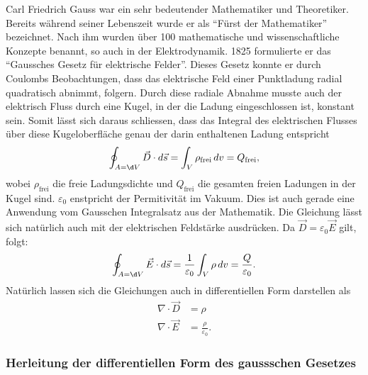 Carl Friedrich Gauss war ein sehr bedeutender Mathematiker und Theoretiker.
Bereits während seiner Lebenszeit wurde er als ``Fürst der Mathematiker'' bezeichnet.
Nach ihm wurden über 100 mathematische und wissenschaftliche Konzepte benannt, so auch in der Elektrodynamik.\cite{maxwell:Carl_Friedrich_Gauß}
1825 formulierte er das ``Gaussches Gesetz für elektrische Felder''.
Dieses Gesetz konnte er durch Coulombs Beobachtungen, dass das elektrische Feld einer Punktladung radial quadratisch abnimmt, folgern.
Durch diese radiale Abnahme musste auch der elektrisch Fluss durch eine Kugel, in der die Ladung eingeschlossen ist, konstant sein.
Somit lässt sich daraus schliessen, dass das Integral des elektrischen Flusses über diese Kugeloberfläche genau der darin enthaltenen Ladung entspricht\cite{maxwell:Gaußscher_Integralsatz}
\[
\oint_{A=\d V} \vec{D} \cdot d\vec{s}
=
\int_{V} \rho_{\text{frei}}\, dv
=
Q_{\text{frei}} ,
\]
wobei $\rho_{\text{frei}}$ die freie Ladungsdichte und $Q_{\text{frei}}$ die gesamten freien Ladungen in der Kugel sind. $\varepsilon_0$ enstpricht der Permitivität im Vakuum. Dies ist auch gerade eine Anwendung vom Gausschen Integralsatz aus der Mathematik.
Die Gleichung lässt sich natürlich auch mit der elektrischen Feldstärke ausdrücken. Da $\vec{D} = \varepsilon_0 \vec{E}$ gilt, folgt:
\[
\oint_{A=\d V} \vec{E} \cdot d\vec{s}
=
\frac{1}{\varepsilon_0}\int_{V} \rho\, dv
=
\frac{Q}{\varepsilon_0} .
\]
Natürlich lassen sich die Gleichungen auch in differentiellen Form darstellen als
\begin{align*}
	\nabla \cdot \vec{D}
	&=
	\rho
	\\
	\nabla \cdot \vec{E}
	&=
	\frac{\rho}{\varepsilon_0} .
\end{align*}

\subsubsection{Herleitung der differentiellen Form des gaussschen Gesetzes}

